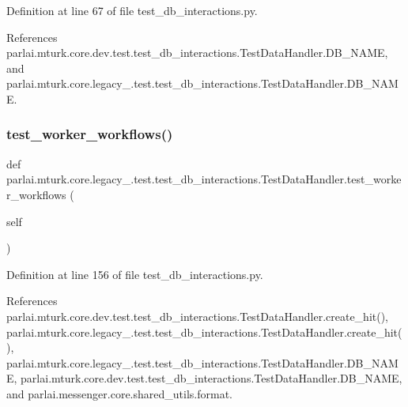 Definition at line 67 of file test\+\_\+db\+\_\+interactions.\+py.



References parlai.\+mturk.\+core.\+dev.\+test.\+test\+\_\+db\+\_\+interactions.\+Test\+Data\+Handler.\+D\+B\+\_\+\+N\+A\+ME, and parlai.\+mturk.\+core.\+legacy\+\_.\+test.\+test\+\_\+db\+\_\+interactions.\+Test\+Data\+Handler.\+D\+B\+\_\+\+N\+A\+ME.

\mbox{\label{classparlai_1_1mturk_1_1core_1_1legacy__2018_1_1test_1_1test__db__interactions_1_1TestDataHandler_a080ec5d7ca57e836021f7d7464807e26}} 
\subsubsection{\texorpdfstring{test\+\_\+worker\+\_\+workflows()}{test\_worker\_workflows()}}
{\footnotesize\ttfamily def parlai.\+mturk.\+core.\+legacy\+\_.\+test.\+test\+\_\+db\+\_\+interactions.\+Test\+Data\+Handler.\+test\+\_\+worker\+\_\+workflows (\begin{DoxyParamCaption}\item[{}]{self }\end{DoxyParamCaption})}



Definition at line 156 of file test\+\_\+db\+\_\+interactions.\+py.



References parlai.\+mturk.\+core.\+dev.\+test.\+test\+\_\+db\+\_\+interactions.\+Test\+Data\+Handler.\+create\+\_\+hit(), parlai.\+mturk.\+core.\+legacy\+\_.\+test.\+test\+\_\+db\+\_\+interactions.\+Test\+Data\+Handler.\+create\+\_\+hit(), parlai.\+mturk.\+core.\+legacy\+\_.\+test.\+test\+\_\+db\+\_\+interactions.\+Test\+Data\+Handler.\+D\+B\+\_\+\+N\+A\+ME, parlai.\+mturk.\+core.\+dev.\+test.\+test\+\_\+db\+\_\+interactions.\+Test\+Data\+Handler.\+D\+B\+\_\+\+N\+A\+ME, and parlai.\+messenger.\+core.\+shared\+\_\+utils.\+format.

